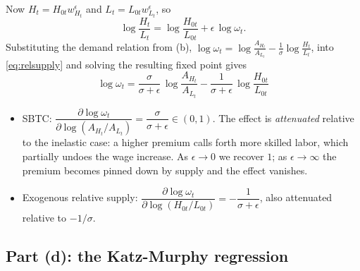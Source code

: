 \documentclass[11pt]{article}
\begin{document}
Now $H_t=H_{0t}w_{H_t}^{\epsilon}$ and $L_t=L_{0t}w_{L_t}^{\epsilon}$, so
\begin{equation}\label{eq:relsupply}
\log\frac{H_t}{L_t}=\log\frac{H_{0t}}{L_{0t}}+\epsilon\,\log\omega_t .
\end{equation}
Substituting the demand relation from (b),
$\log\omega_t=\log\frac{A_{H_t}}{A_{L_t}}-\frac1\sigma\log\frac{H_t}{L_t}$, into
\eqref{eq:relsupply} and solving the resulting fixed point gives
\begin{equation}
\boxed{\;\log\omega_{t}=\frac{\sigma}{\sigma+\epsilon}\,
   \log\frac{A_{H_t}}{A_{L_t}}-\frac{1}{\sigma+\epsilon}\,
   \log\frac{H_{0t}}{L_{0t}}\;}
\end{equation}
\begin{itemize}[nosep]
\item SBTC: $\dfrac{\partial\log\omega_t}{\partial\log(A_{H_t}/A_{L_t})}
=\dfrac{\sigma}{\sigma+\epsilon}\in(0,1)$. The effect is \emph{attenuated}
relative to the inelastic case: a higher premium calls forth more skilled
labor, which partially undoes the wage increase. As $\epsilon\rightarrow0$ we recover
$1$; as $\epsilon\rightarrow\infty$ the premium becomes pinned down by supply and the
effect vanishes.
\item Exogenous relative supply:
$\dfrac{\partial\log\omega_t}{\partial\log(H_{0t}/L_{0t})}
=-\dfrac1{\sigma+\epsilon}$, also attenuated relative to $-1/\sigma$.
\end{itemize}

\subsection*{Part (d): the Katz-Murphy regression}
\end{document}
